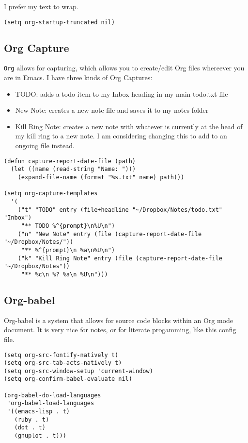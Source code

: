 \documentclass{article}
\begin{document}
I prefer my text to wrap.

\begin{verbatim}
(setq org-startup-truncated nil)
\end{verbatim}

\subsection{Org Capture}
\label{sec-9-3}

\texttt{Org} allows for capturing, which allows you to create/edit Org files whereever you are in Emacs. I have three kinds of Org Captures:
\begin{itemize}
\item TODO: adds a todo item to my Inbox heading in my main todo.txt file
\item New Note: creates a new note file and saves it to my notes folder
\item Kill Ring Note: creates a new note with whatever is currently at the head of my kill ring to a new note. I am considering changing this to add to an ongoing file instead.
\end{itemize}

\begin{verbatim}
(defun capture-report-date-file (path)
  (let ((name (read-string "Name: ")))
    (expand-file-name (format "%s.txt" name) path)))

(setq org-capture-templates
  '(
    ("t" "TODO" entry (file+headline "~/Dropbox/Notes/todo.txt" "Inbox")
     "** TODO %^{prompt}\n%U\n")
    ("n" "New Note" entry (file (capture-report-date-file "~/Dropbox/Notes/"))
     "** %^{prompt}\n %a\n%U\n")
    ("k" "Kill Ring Note" entry (file (capture-report-date-file "~/Dropbox/Notes"))
     "** %c\n %? %a\n %U\n")))
\end{verbatim}

\subsection{Org-babel}
\label{sec-9-4}

Org-babel is a system that allows for source code blocks within an Org mode document. It is very nice for notes, or for literate progamming, like this config file.

\begin{verbatim}
(setq org-src-fontify-natively t)
(setq org-src-tab-acts-natively t)
(setq org-src-window-setup 'current-window)
(setq org-confirm-babel-evaluate nil)

(org-babel-do-load-languages
 'org-babel-load-languages
 '((emacs-lisp . t)
   (ruby . t)
   (dot . t)
   (gnuplot . t)))
\end{verbatim}
\end{document}
